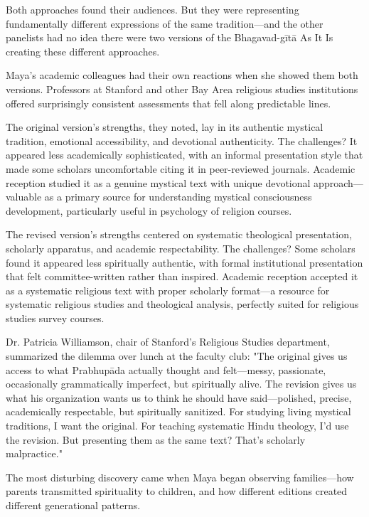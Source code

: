 \documentclass[12pt,twoside]{book}
\begin{document}
Both approaches found their audiences. But they were representing fundamentally different expressions of the same tradition—and the other panelists had no idea there were two versions of the Bhagavad-gītā As It Is creating these different approaches.

Maya's academic colleagues had their own reactions when she showed them both versions. Professors at Stanford and other Bay Area religious studies institutions offered surprisingly consistent assessments that fell along predictable lines.

The original version's strengths, they noted, lay in its authentic mystical tradition, emotional accessibility, and devotional authenticity. The challenges? It appeared less academically sophisticated, with an informal presentation style that made some scholars uncomfortable citing it in peer-reviewed journals. Academic reception studied it as a genuine mystical text with unique devotional approach—valuable as a primary source for understanding mystical consciousness development, particularly useful in psychology of religion courses.

The revised version's strengths centered on systematic theological presentation, scholarly apparatus, and academic respectability. The challenges? Some scholars found it appeared less spiritually authentic, with formal institutional presentation that felt committee-written rather than inspired. Academic reception accepted it as a systematic religious text with proper scholarly format—a resource for systematic religious studies and theological analysis, perfectly suited for religious studies survey courses.

Dr. Patricia Williamson, chair of Stanford's Religious Studies department, summarized the dilemma over lunch at the faculty club: "The original gives us access to what Prabhupāda actually thought and felt—messy, passionate, occasionally grammatically imperfect, but spiritually alive. The revision gives us what his organization wants us to think he should have said—polished, precise, academically respectable, but spiritually sanitized. For studying living mystical traditions, I want the original. For teaching systematic Hindu theology, I'd use the revision. But presenting them as the same text? That's scholarly malpractice."

The most disturbing discovery came when Maya began observing families—how parents transmitted spirituality to children, and how different editions created different generational patterns.
\end{document}
